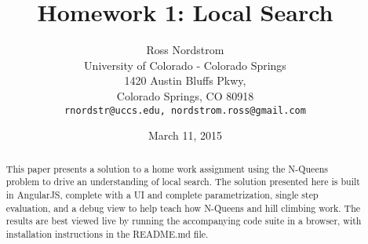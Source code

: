 \documentclass{sig-alternate}
\begin{document}
\title{Homework 1: Local Search}
\author{Ross Nordstrom\\
        University of Colorado - Colorado Springs\\
        1420 Austin Bluffs Pkwy,\\
        Colorado Springs, CO 80918\\
        \texttt{rnordstr@uccs.edu, nordstrom.ross@gmail.com}
       }
\date{March 11, 2015}

\maketitle

\begin{abstract}
   This paper presents a solution to a home work assignment using the N-Queens problem to drive
   an understanding of local search. The solution presented here is built in AngularJS, complete
   with a UI and complete parametrization, single step evaluation, and a debug view to help
   teach how N-Queens and hill climbing work. The results are best viewed live by running
   the accompanying code suite in a browser, with installation instructions in the README.md file.
\end{abstract}






\nocite{*}
{}

\end{document}
